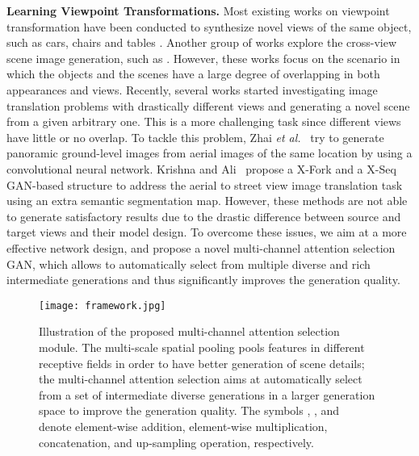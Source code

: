 \documentclass[10pt,twocolumn,letterpaper]{article}
\def\etal{\textit{et al.}~}
\def\ci#1{\textcircled{\resizebox{.4em}{!}{#1}}}
\begin{document}
\noindent\textbf{Learning Viewpoint Transformations.}
Most existing works on viewpoint transformation have been conducted to synthesize novel views of the same object, such as cars, chairs and tables \cite{dosovitskiy2017learning,tatarchenko2016multi,choy20163d}.
Another group of works explore the cross-view scene image generation, such as \cite{yin2018novel,zhou2016view}.
However, these works focus on the scenario in which the objects and the scenes have a large degree of overlapping in both appearances and views.
Recently, several works started investigating image translation problems with drastically different views and generating a novel scene from a given arbitrary one. This is a more challenging task since different views have little or no overlap. To tackle this problem, Zhai \etal \cite{zhai2017predicting} try to generate panoramic ground-level images from aerial images of the same location by using a convolutional neural network. 
Krishna and Ali~\cite{regmi2018cross} propose a X-Fork and a X-Seq GAN-based structure to address the aerial to street view image translation task using an extra semantic segmentation map. However, these methods are not able to generate satisfactory results due to the drastic difference between source and target views and their model design. To overcome these issues, we aim at a more effective network design, and propose a novel multi-channel attention selection GAN, which allows to automatically select from multiple diverse and rich intermediate generations and thus significantly improves the generation quality.

\begin{figure*}[!t]
	\centering
	\texttt{[image: framework.jpg]}
	\caption{Illustration of the proposed multi-channel attention selection module. The multi-scale spatial pooling pools features in different receptive fields in order to have better generation of scene details; the multi-channel attention selection aims at automatically select from a set of intermediate diverse generations in a larger generation space to improve the generation quality. The symbols , ,  and \protect\ci{} denote element-wise addition, element-wise multiplication, concatenation, and up-sampling operation, respectively.}
	\label{fig:ppm}
	\vspace{-0.6cm}
\end{figure*}
\end{document}
